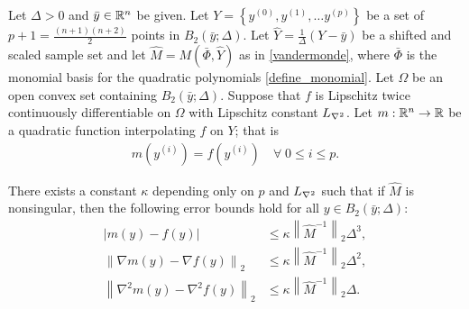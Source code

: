\documentclass{article}
\newcommand{\real}{\mathbb R}
\begin{document}
\begin{theorem}
\label{3_16_replacement2}
Let  $\Delta>0$ and $\bar y \in \mathbb R^n$ be given.
Let $Y = \left\{y^{(0)}, y^{(1)}, \ldots y^{(p)} \right\}$ be a set of $p+1=\frac{(n+1)(n+2)}{2}$ points in $B_2\left(\bar y;\Delta\right)$.
Let  $\hat{Y}=\frac{1}{\Delta} \left(Y-\bar y\right)$ be a shifted and scaled sample set and let $\hat{M} = M(\bar \Phi,\hat{Y})$ as in \cref{vandermonde},
where $\bar \Phi$ is the monomial basis for the quadratic polynomials \cref{define_monomial}.
Let $\Omega$ be an open convex set containing $B_2(\bar y;\Delta)$.
Suppose that $f$ is Lipschitz twice continuously differentiable on $\Omega$ with Lipschitz constant ${L_{\nabla^2}}$.
Let $m: \Rn \rightarrow \real$ be a quadratic function interpolating $f$ on $Y$; that is
%
\begin{align}
m\left(y^{(i)}\right) = f\left(y^{(i)}\right) \quad \forall \; 0 \le i \le p. \label{nce_interpolation_condition}
\end{align}

There exists a constant $\kappa$ depending only on $p$ and ${L_{\nabla^2}}$ such that 
if $\hat{M}$ is nonsingular, then
the following error bounds hold for all $y \in B_2\left(\bar y; \Delta\right)$:
\begin{align}
\left|m(y) - f(y)\right| &\le \kappa \left\|\hat M^{-1}\right\|_2 \Delta^3,   \label{fbound} \\
\left\|\nabla m(y) - \nabla f(y)\right\|_2 &\le \kappa \left\|\hat M^{-1} \right\|_2\Delta^2,  \label{gbound}\\
\left\|\nabla^2 m(y) - \nabla^2 f(y)\right\|_2 &\le \kappa \left\|\hat M^{-1} \right\|_2\Delta.  \label{hbound}
\end{align}






\end{theorem}
\end{document}
